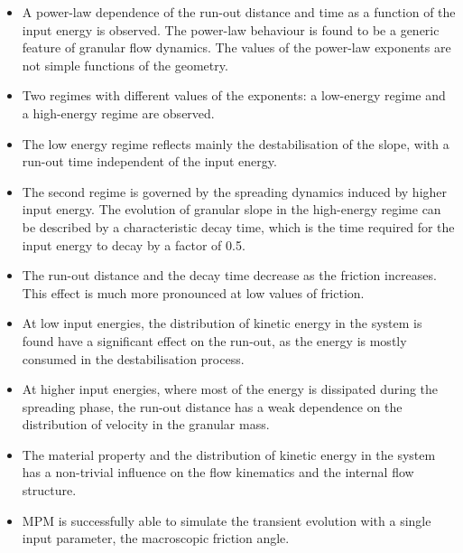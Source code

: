 \documentclass[3p,times,procedia,number]{elsarticle}
\begin{document}
\begin{itemize}

  \item A power-law dependence of the run-out distance and time as a 
    function of the input energy is observed. The power-law behaviour is found to 
    be a generic feature of granular flow dynamics. The values of the power-law
    exponents are not simple functions of the geometry. 

  \item Two regimes with different values of the exponents: 
    a low-energy regime and a high-energy regime are observed. 

  \item The low energy regime reflects mainly the destabilisation of the slope, 
    with a run-out time independent of the input energy.

  \item The second regime is governed by the spreading dynamics 
    induced by higher input energy. The evolution of granular slope in the 
    high-energy regime can be described by a characteristic decay time, which is 
    the time required for the input energy to decay by a factor of 0.5.

  \item The run-out distance and the decay time decrease as the friction 
    increases. This effect is much more pronounced at low values of friction.

  \item  At low input energies, the distribution of kinetic energy in the system is 
    found have a significant effect on the run-out, as the energy is mostly 
    consumed in the destabilisation process. 
     
  \item At higher input energies, where most of the energy is dissipated during 
    the spreading phase, the run-out distance has a weak dependence on the 
    distribution of velocity in the granular mass. 

  \item The material property and the distribution of kinetic energy in the 
    system has a non-trivial influence on the flow kinematics and the internal flow 
    structure.

  \item MPM is successfully able to simulate the transient evolution with a 
    single input parameter, the macroscopic friction angle.

\end{itemize}
\end{document}
